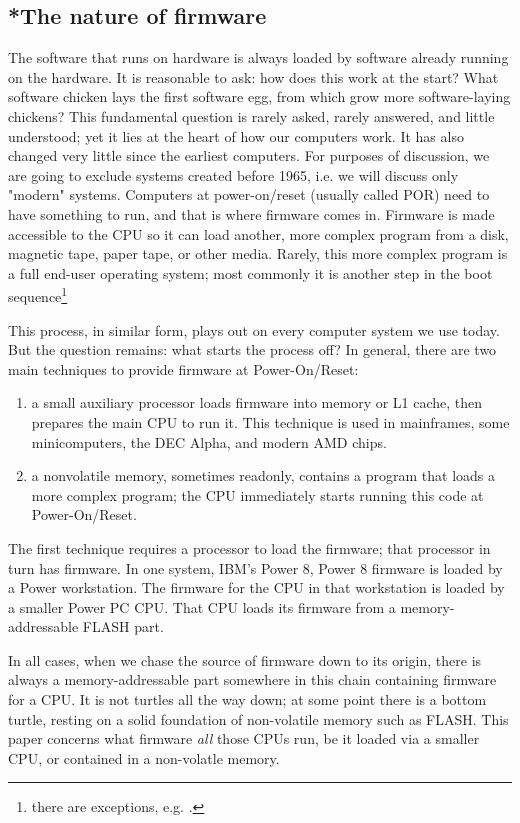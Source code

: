 \documentclass[conference]{IEEEtran}
\begin{document}
\subsection{*The nature of firmware}
The software that runs on hardware is always loaded by software already running on the hardware. 
It is reasonable to ask: how does this work at the start? What software chicken lays the first software egg, from which grow more software-laying chickens?
This fundamental question is rarely asked, rarely answered, and little understood; yet it lies at the heart of how our computers work.
It has also changed very little since the earliest computers.
For purposes of discussion, we are going to exclude systems created before 1965, i.e. we will discuss only "modern" systems.
Computers at power-on/reset (usually called POR) need to have something to run, and that is where firmware comes in. Firmware is made accessible to the CPU so it can load another, more complex program from a disk, magnetic tape, paper tape, or other media. Rarely, this more complex program is a full end-user operating system; most commonly it is another step in the boot sequence\footnote{there are exceptions, e.g. \cite{minnich2000linux}.}

This process, in similar form, plays out on every computer system we use today. But the question remains: what starts the process off? 
In general, there are two main techniques to provide firmware at Power-On/Reset:
\begin{enumerate}
    \item a small auxiliary processor loads firmware into memory or L1 cache, then prepares the main CPU to run it. This technique is used in mainframes, some minicomputers, the DEC Alpha, and modern AMD chips. 
\item a nonvolatile memory, sometimes readonly, contains a program that loads a more complex program; the CPU immediately starts running this code at Power-On/Reset.
\end{enumerate}
The first technique requires a processor to load the firmware; that processor in turn has firmware. In one system, IBM's Power 8, Power 8 firmware is loaded by a Power workstation. The firmware for the CPU in that workstation is loaded by a smaller Power PC CPU. That CPU loads its firmware from a memory-addressable FLASH part. 

In all cases, when we chase the source of firmware down to its origin, there is always a memory-addressable part somewhere in this chain containing firmware for a CPU.
It is not turtles all the way down; at some point there is a bottom turtle, resting on a solid foundation of non-volatile memory such as FLASH. 
This paper concerns what firmware  \textit{all} those CPUs run, be it loaded via a smaller CPU, or contained in a non-volatle memory. 
\end{document}

